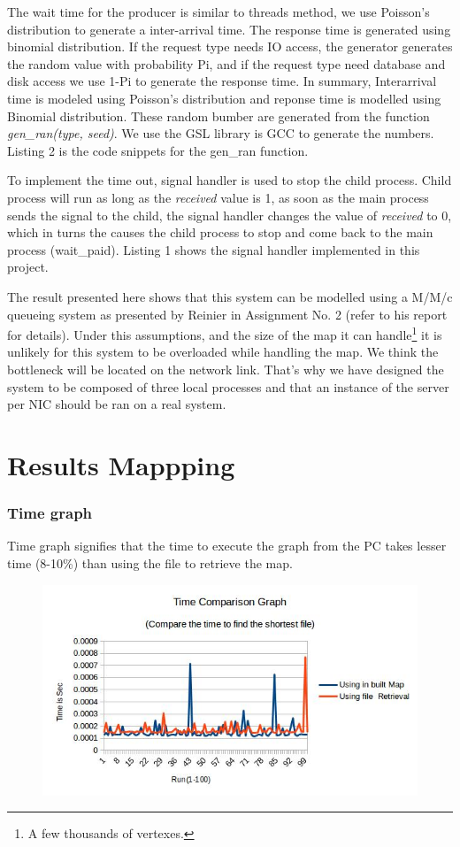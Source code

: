 \documentclass[10pt]{article}
\begin{document}
The wait time for the producer is similar to threads method, we use Poisson's distribution to generate a inter-arrival time. The response time is generated using binomial distribution. If the request type needs IO access, the generator generates the random value with probability Pi, and if the request type need database and disk access we use 1-Pi to generate the response time. In summary, Interarrival time is modeled using Poisson's distribution and reponse time is modelled using Binomial distribution. These random bumber are generated from the function \textit{gen\_ran(type, seed)}. We use the GSL library is GCC to generate the numbers. Listing 2 is the code snippets for the gen\_ran function.

To implement the time out, signal handler is used to stop the child process. Child process will run as long as the \textit{received} value is 1, as soon as the main process sends the signal to the child, the signal handler changes the value of \textit{received} to 0, which in turns the causes the child process to stop and come back to the main process (wait\_paid). Listing 1 shows the signal handler implemented in this project.

The result presented here shows that this system can be modelled using a M/M/c
queueing system as presented by Reinier in Assignment No. 2 (refer to his report
for details). Under this assumptions, and the size of the map it can
handle\footnote{A few thousands of vertexes.} it is unlikely for this system to be
overloaded while handling the map. We think the bottleneck will be located on
the network link. That's why we have designed the system to be composed of three
local processes and that an instance of the server per NIC should be ran on a
real system.

\section{Results Mappping}
\subsubsection{Time graph}
Time graph signifies that the time to execute the graph from the PC takes lesser time (8-10\%) than using the file to retrieve the map.
\begin{figure}[h]
\centering
{}
\includegraphics [width=15cm]{Time.jpg}
\end{figure}
\end{document}
